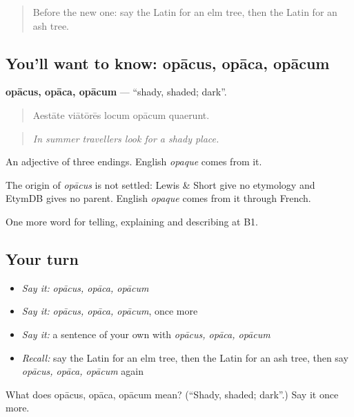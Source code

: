 \label{lesson:LA-C484-opacus}



\begin{quote}
Before the new one: say the Latin for an elm tree, then the Latin for an ash tree.
\end{quote}

\subsection*{You'll want to know: opācus, opāca, opācum}
\textbf{opācus, opāca, opācum} — \textquotedblleft{}shady, shaded; dark\textquotedblright{}.

\begin{quote}
Aestāte viātōrēs locum opācum quaerunt.
\end{quote}

\begin{quote}
\emph{In summer travellers look for a shady place.}
\end{quote}

An adjective of three endings. English \emph{opaque} comes from it.

\begin{cousinweb}
The origin of \emph{opācus} is not settled: Lewis \& Short give no etymology and EtymDB gives no parent. English \emph{opaque} comes from it through French.
\end{cousinweb}

\begin{grammarlens}[title={What you've built}]
One more word for telling, explaining and describing at B1.
\end{grammarlens}

\subsection*{Your turn}
\begin{itemize}
\raggedright
  \item \emph{Say it:} \emph{opācus, opāca, opācum}
  \item \emph{Say it:} \emph{opācus, opāca, opācum}, once more
  \item \emph{Say it:} a sentence of your own with \emph{opācus, opāca, opācum}
  \item \emph{Recall:} say the Latin for an elm tree, then the Latin for an ash tree, then say \emph{opācus, opāca, opācum} again
\end{itemize}

\begin{tcolorbox}[breakable,colback=teal!4,colframe=teal!35!black,title={Before you move on}]
What does opācus, opāca, opācum mean? (\textquotedblleft{}Shady, shaded; dark\textquotedblright{}.) Say it once more.
\end{tcolorbox}
